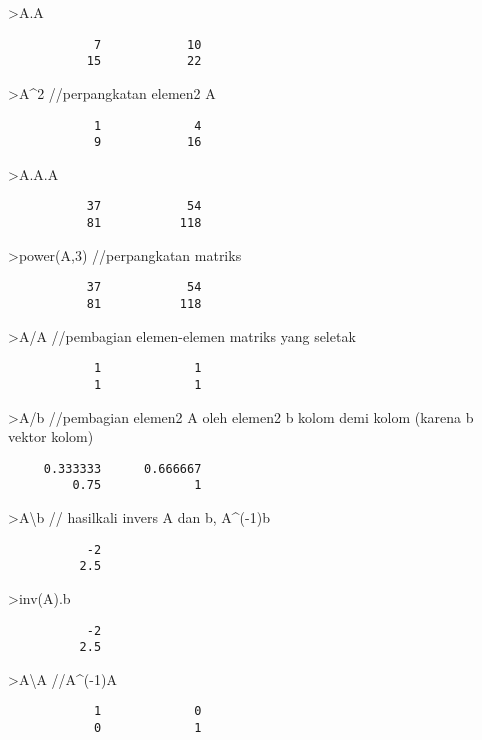 \documentclass[
]{book}
\begin{document}
\textgreater A.A

\begin{verbatim}
            7            10 
           15            22 
\end{verbatim}

\textgreater A\^{}2 //perpangkatan elemen2 A

\begin{verbatim}
            1             4 
            9            16 
\end{verbatim}

\textgreater A.A.A

\begin{verbatim}
           37            54 
           81           118 
\end{verbatim}

\textgreater power(A,3) //perpangkatan matriks

\begin{verbatim}
           37            54 
           81           118 
\end{verbatim}

\textgreater A/A //pembagian elemen-elemen matriks yang seletak

\begin{verbatim}
            1             1 
            1             1 
\end{verbatim}

\textgreater A/b //pembagian elemen2 A oleh elemen2 b kolom demi kolom (karena b vektor kolom)

\begin{verbatim}
     0.333333      0.666667 
         0.75             1 
\end{verbatim}

\textgreater A\textbackslash b // hasilkali invers A dan b, A\^{}(-1)b

\begin{verbatim}
           -2 
          2.5 
\end{verbatim}

\textgreater inv(A).b

\begin{verbatim}
           -2 
          2.5 
\end{verbatim}

\textgreater A\textbackslash A //A\^{}(-1)A

\begin{verbatim}
            1             0 
            0             1 
\end{verbatim}
\end{document}
